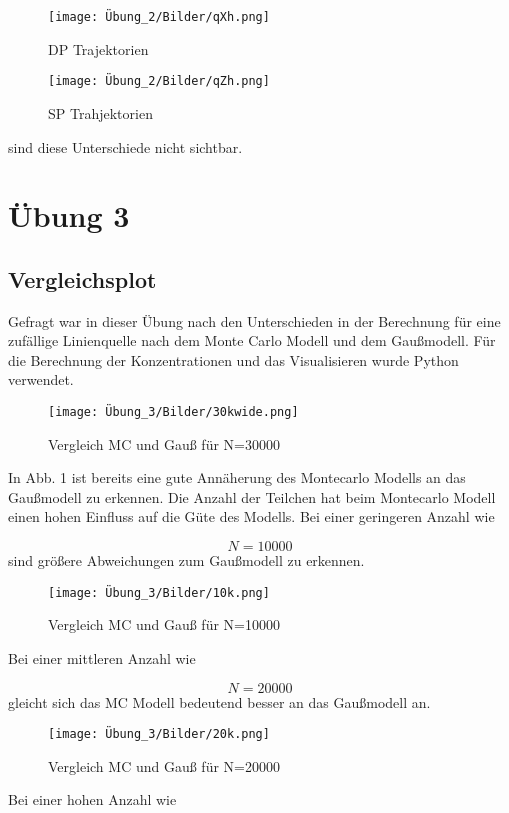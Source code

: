 \documentclass[ngerman]{scrartcl}
\begin{document}
\begin{figure}[H]
    \centering
    \texttt{[image: Übung\_2/Bilder/qXh.png]}
    \caption{DP Trajektorien}
    \label{fig:my_label}
\end{figure}
\begin{figure}[H]
    \centering
    \texttt{[image: Übung\_2/Bilder/qZh.png]}
    \caption{SP Trahjektorien}
    \label{fig:my_label}
\end{figure}

sind diese Unterschiede nicht sichtbar.
\section{Übung 3}

\subsection{Vergleichsplot}
Gefragt war in dieser Übung nach den Unterschieden in der Berechnung  für eine zufällige Linienquelle nach dem Monte Carlo Modell und dem Gaußmodell. Für die Berechnung der Konzentrationen und das Visualisieren wurde Python verwendet.
\begin{figure}[H]
    \centering
    \texttt{[image: Übung\_3/Bilder/30kwide.png]}
    \caption{Vergleich MC und Gauß für N=30000}
    \label{fig:my_label}
\end{figure}
In Abb. 1 ist bereits eine gute Annäherung des Montecarlo Modells an das Gaußmodell zu erkennen. Die Anzahl der Teilchen hat beim Montecarlo Modell einen hohen Einfluss auf die Güte des Modells. Bei einer geringeren Anzahl wie 

\begin{equation}
    N=10000
\end{equation}
sind größere Abweichungen zum Gaußmodell zu erkennen.

\begin{figure}[H]
    \centering
    \texttt{[image: Übung\_3/Bilder/10k.png]}
    \caption{Vergleich MC und Gauß für N=10000}
    \label{fig:my_label}
\end{figure}
Bei einer mittleren Anzahl wie 

\begin{equation}
    N=20000
\end{equation}
gleicht sich das MC Modell bedeutend besser an das Gaußmodell an.
\begin{figure}[H]
    \centering
    \texttt{[image: Übung\_3/Bilder/20k.png]}
    \caption{Vergleich MC und Gauß für N=20000}
    \label{fig:my_label}
\end{figure}
Bei einer hohen Anzahl wie 
\end{document}
